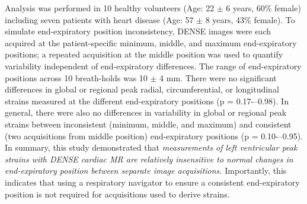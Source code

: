	Analysis was performed in 10 healthy volunteers (Age: 22 $\pm$ 6 years, 60\% female) including seven patients with heart disease (Age: 57 $\pm$ 8 years, 43\% female). To simulate end-expiratory position inconsistency, DENSE images were each acquired at the patient-specific minimum, middle, and maximum end-expiratory positions; a repeated acquisition at the middle position was used to quantify variability independent of end-expiratory differences. The range of end-expiratory positions across 10 breath-holds was 10 $\pm$ 4 mm. There were no significant differences in global or regional peak radial, circumferential, or longitudinal strains measured at the different end-expiratory positions (p = 0.17-–0.98). In general, there were also no differences in variability in global or regional peak strains between inconsistent (minimum, middle, and maximum) and consistent (two acquisitions from middle position) end-expiratory positions (p = 0.10-–0.95). In summary, this study demonstrated that \textit{measurements of left ventricular peak strains with DENSE cardiac MR are relatively insensitive to normal changes in end-expiratory position between separate image acquisitions.} Importantly, this indicates that using a respiratory navigator to ensure a consistent end-expiratory position is not required for acquisitions used to derive strains.
	
